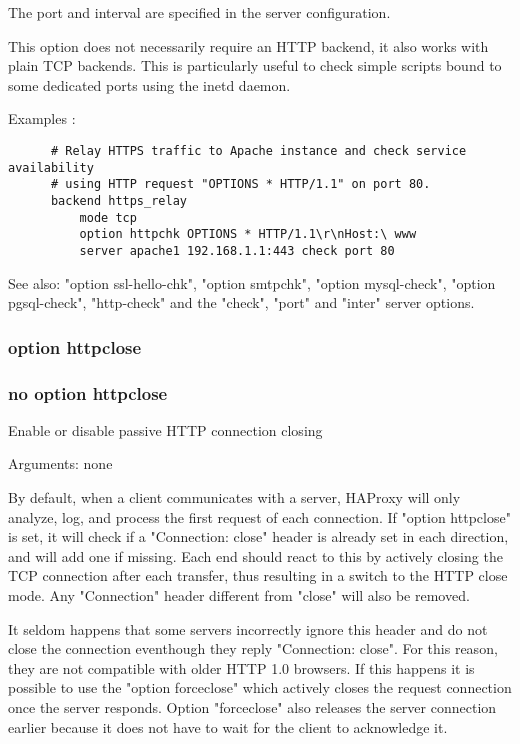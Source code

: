   The port and interval are specified in the server configuration.

  This option does not necessarily require an HTTP backend, it also works with
  plain TCP backends. This is particularly useful to check simple scripts bound
  to some dedicated ports using the inetd daemon.

  Examples :
\begin{verbatim}
      # Relay HTTPS traffic to Apache instance and check service availability
      # using HTTP request "OPTIONS * HTTP/1.1" on port 80.
      backend https_relay
          mode tcp
          option httpchk OPTIONS * HTTP/1.1\r\nHost:\ www
          server apache1 192.168.1.1:443 check port 80
\end{verbatim}

  See also: "option ssl-hello-chk", "option smtpchk", "option mysql-check",
             "option pgsql-check", "http-check" and the "check", "port" and
             "inter" server options.

\subsubsection{option httpclose}
\subsubsection{no option httpclose}


  Enable or disable passive HTTP connection closing


  Arguments: none

  By default, when a client communicates with a server, HAProxy will only
  analyze, log, and process the first request of each connection. If "option
  httpclose" is set, it will check if a "Connection: close" header is already
  set in each direction, and will add one if missing. Each end should react to
  this by actively closing the TCP connection after each transfer, thus
  resulting in a switch to the HTTP close mode. Any "Connection" header
  different from "close" will also be removed.

  It seldom happens that some servers incorrectly ignore this header and do not
  close the connection eventhough they reply "Connection: close". For this
  reason, they are not compatible with older HTTP 1.0 browsers. If this happens
  it is possible to use the "option forceclose" which actively closes the
  request connection once the server responds. Option "forceclose" also
  releases the server connection earlier because it does not have to wait for
  the client to acknowledge it.

